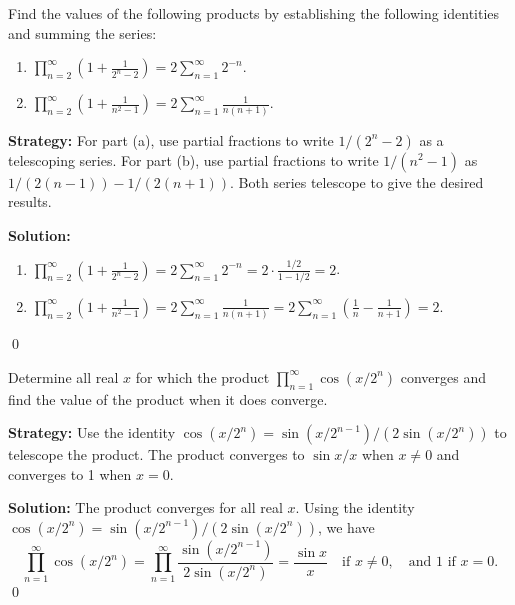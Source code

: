 \begin{problembox}
Find the values of the following products by establishing the following identities and summing the series:
\begin{enumerate}[label=\alph*)]
\item \(\prod_{n=2}^{\infty} \left( 1 + \frac{1}{2^n - 2} \right) = 2 \sum_{n=1}^{\infty} 2^{-n}\).
\item \(\prod_{n=2}^{\infty} \left( 1 + \frac{1}{n^2 - 1} \right) = 2 \sum_{n=1}^{\infty} \frac{1}{n(n+1)}\).
\end{enumerate}
\end{problembox}

\noindent\textbf{Strategy:} For part (a), use partial fractions to write \(1/(2^n-2)\) as a telescoping series. For part (b), use partial fractions to write \(1/(n^2-1)\) as \(1/(2(n-1)) - 1/(2(n+1))\). Both series telescope to give the desired results.

\bigskip\noindent\textbf{Solution:}
\begin{enumerate}[label=(\alph*)]
\item \(\prod_{n=2}^{\infty} \left( 1 + \frac{1}{2^n - 2} \right) = 2 \sum_{n=1}^{\infty} 2^{-n} = 2 \cdot \frac{1/2}{1-1/2} = 2\).

\item \(\prod_{n=2}^{\infty} \left( 1 + \frac{1}{n^2 - 1} \right) = 2 \sum_{n=1}^{\infty} \frac{1}{n(n+1)} = 2 \sum_{n=1}^{\infty} \left(\frac{1}{n} - \frac{1}{n+1}\right) = 2\).
\end{enumerate}\qed



\begin{problembox}
Determine all real \(x\) for which the product \(\prod_{n=1}^{\infty} \cos (x/2^n)\) converges and find the value of the product when it does converge.
\end{problembox}

\noindent\textbf{Strategy:} Use the identity \(\cos(x/2^n) = \sin(x/2^{n-1})/(2\sin(x/2^n))\) to telescope the product. The product converges to \(\sin x/x\) when \(x \neq 0\) and converges to 1 when \(x = 0\).

\bigskip\noindent\textbf{Solution:}
The product converges for all real \(x\). Using the identity \(\cos(x/2^n) = \sin(x/2^{n-1})/(2\sin(x/2^n))\), we have
\[\prod_{n=1}^{\infty} \cos(x/2^n) = \prod_{n=1}^{\infty} \frac{\sin(x/2^{n-1})}{2\sin(x/2^n)} = \frac{\sin x}{x} \quad \text{if } x \neq 0, \quad \text{and } 1 \text{ if } x = 0.\] \qed



